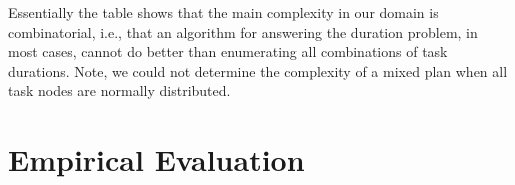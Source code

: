 \documentclass{article}
\begin{document}
Essentially the table shows that the main complexity in our domain is combinatorial, i.e., that an algorithm for answering the duration problem, in most cases, cannot do better than enumerating all combinations of task durations. Note, we could not determine the complexity of a mixed plan when all task nodes are normally distributed. 


\section{Empirical Evaluation}\label{sec:exp}


\end{document}

